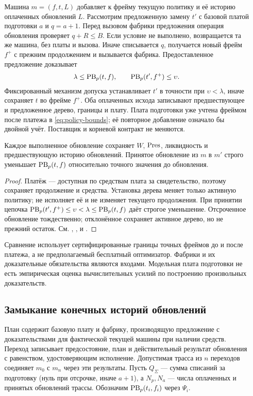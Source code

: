 Машина $m=(f,t,L)$ добавляет к фрейму текущую политику и её историю оплаченных обновлений $L$. Рассмотрим предложенную замену $t'$ с базовой платой подготовки $a$ и $q=a+1$. Перед вызовом фабрики предложения операция обновления проверяет $q+R\le B$. Если условие не выполнено, возвращается та же машина, без платы и вызова. Иначе списывается $q$, получается новый фрейм $f^+$ с прежним продолжением и вызывается фабрика. Предоставленное предложение доказывает
\begin{equation}\label{eq:policy-bounds}
 \lambda\le\operatorname{PB}_p(t,f),\qquad \operatorname{PB}_p(t',f^+)\le\upsilon.
\end{equation}
Фиксированный механизм допуска устанавливает $t'$ в точности при $\upsilon<\lambda$, иначе сохраняет $t$ во фрейме $f^+$. Оба оплаченных исхода записывают предшествующее и предложенное дерево, границы и плату. Плата подготовки уже учтена фреймом после платежа в \eqref{eq:policy-bounds}; её повторное добавление означало бы двойной учёт. Поставщик и корневой контракт не меняются.

\begin{theorem}\label{thm:policy-local}
Каждое выполненное обновление сохраняет $W$, $\operatorname{Pres}$, ликвидность и предшествующую историю обновлений. Принятое обновление из $m$ в $m'$ строго уменьшает $\operatorname{PB}_p(t,f)$ относительно точного значения до обновления.
\end{theorem}
\begin{proof}
Платёж --- доступная по средствам плата за свидетельство, поэтому сохраняет продолжение и средства. Установка дерева меняет только активную политику; не исполняет её и не изменяет текущего продолжения. При принятии цепочка $\operatorname{PB}_p(t',f^+)\le\upsilon<\lambda\le\operatorname{PB}_p(t,f)$ даёт строгое уменьшение. Отсроченное обновление тождественно; отклонённое сохраняет активное дерево, но не прежний остаток. См. , ,  и .
\end{proof}
Сравнение использует сертифицированные границы точных фреймов до и после платежа, а не предполагаемый бесплатный оптимизатор. Фабрики и их доказательные обязательства являются входами. Модельная плата подготовки не есть эмпирическая оценка вычислительных усилий по построению произвольных доказательств.

\subsection{Замыкание конечных историй обновлений}
План содержит базовую плату и фабрику, производящую предложение с доказательствами для фактической текущей машины при наличии средств. Переход записывает предсостояние, план и действительный результат обновления с равенством, удостоверяющим исполнение. Допустимая трасса из $n$ переходов соединяет $m_0$ с $m_n$ через эти результаты. Пусть $Q_\Sigma$ --- сумма списаний за подготовку (нуль при отсрочке, иначе $a+1$), а $N_p,N_a$ --- числа оплаченных и принятых обновлений трассы. Обозначим $\operatorname{PB}_p(t_i,f_i)$ через $\Psi_i$.

